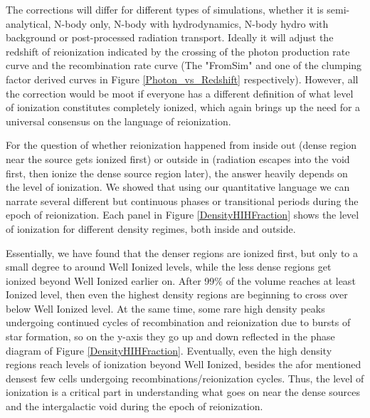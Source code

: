 \documentclass[letterpaper,10pt]{article}
\renewcommand{\(}{\left(}
\renewcommand{\)}{\right)}
\begin{document}
The corrections will differ for different types of simulations, 
whether it is semi-analytical, N-body only, N-body with hydrodynamics, 
N-body hydro with background or post-processed radiation transport.
Ideally it will adjust the redshift of reionization indicated by the crossing of 
the photon production rate curve and the recombination rate curve 
(The "FromSim" and one of the clumping factor derived curves in 
Figure \ref{Photon_vs_Redshift} respectively).  However, all the correction 
would be moot if everyone has a different definition of what level of 
ionization constitutes completely ionized, which again brings up the 
need for a universal consensus on the language of reionization.

For the question of whether reionization happened from inside out
(dense region near the source gets ionized first) or outside in
(radiation escapes into the void first, then ionize the dense source
region later), the answer heavily depends on the level of ionization.  We
showed that using our quantitative language we can narrate several
different but continuous phases or transitional periods during the 
epoch of reionization.  Each panel in Figure
\ref{DensityHIHFraction} shows the level of ionization for different
density regimes, both inside and outside. 

Essentially, we have found that the denser regions are ionized first,
but only to a small degree to around Well Ionized levels, while the less dense 
regions get ionized beyond Well Ionized earlier on.  After 99\% of the volume 
reaches at least Ionized level, then even the highest density regions are 
beginning to cross over below Well Ionized level.  At the same time, some 
rare high density peaks undergoing continued cycles of recombination and 
reionization due to bursts of star formation, so on the y-axis they go up and down
reflected in the phase diagram of Figure \ref{DensityHIHFraction}.
Eventually, even the high density regions reach levels of ionization 
beyond Well Ionized, besides the afor mentioned densest few cells undergoing recombinations/reionization cycles. Thus, the level of ionization is a critical part in
understanding what goes on near the dense sources and the
intergalactic void during the epoch of reionization.  


\end{document}
